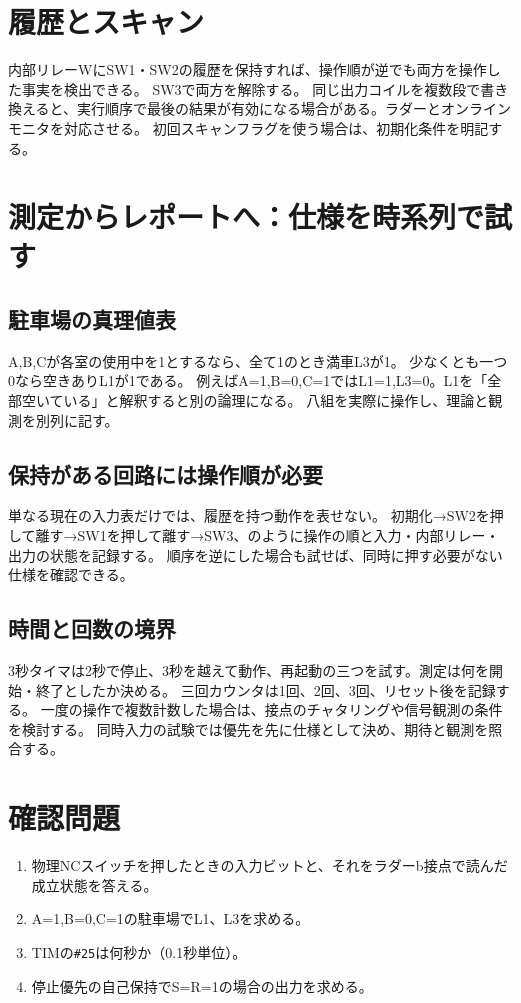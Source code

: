 \documentclass[lualatex,a4paper,10pt]{jlreq}
\begin{document}
\section{履歴とスキャン}\label{sec:auto6}
内部リレーWにSW1・SW2の履歴を保持すれば、操作順が逆でも両方を操作した事実を検出できる。
SW3で両方を解除する。
同じ出力コイルを複数段で書き換えると、実行順序で最後の結果が有効になる場合がある。ラダーとオンラインモニタを対応させる。
初回スキャンフラグを使う場合は、初期化条件を明記する。
\section{測定からレポートへ：仕様を時系列で試す}\label{sec:auto7}
\subsection{駐車場の真理値表}
A,B,Cが各室の使用中を1とするなら、全て1のとき満車L3が1。
少なくとも一つ0なら空きありL1が1である。
例えばA=1,B=0,C=1ではL1=1,L3=0。L1を「全部空いている」と解釈すると別の論理になる。
八組を実際に操作し、理論と観測を別列に記す。
\subsection{保持がある回路には操作順が必要}
単なる現在の入力表だけでは、履歴を持つ動作を表せない。
初期化→SW2を押して離す→SW1を押して離す→SW3、のように操作の順と入力・内部リレー・出力の状態を記録する。
順序を逆にした場合も試せば、同時に押す必要がない仕様を確認できる。
\subsection{時間と回数の境界}
3秒タイマは2秒で停止、3秒を越えて動作、再起動の三つを試す。測定は何を開始・終了としたか決める。
三回カウンタは1回、2回、3回、リセット後を記録する。
一度の操作で複数計数した場合は、接点のチャタリングや信号観測の条件を検討する。
同時入力の試験では優先を先に仕様として決め、期待と観測を照合する。

\clearpage
\section{確認問題}\label{sec:auto8}
\begin{enumerate}
\item 物理NCスイッチを押したときの入力ビットと、それをラダーb接点で読んだ成立状態を答える。\answerline
\item A=1,B=0,C=1の駐車場でL1、L3を求める。\answerline
\item TIMの\texttt{\#25}は何秒か（0.1秒単位）。\answerline
\item 停止優先の自己保持でS=R=1の場合の出力を求める。\answerline
\end{enumerate}
\end{document}
